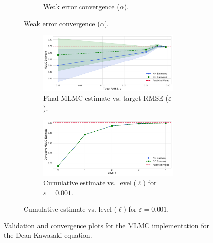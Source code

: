 \begin{figure}[htbp]
\begin{subfigure}{\textwidth}
\begin{subfigure}[b]{0.48\textwidth}
            \caption{Weak error convergence ($\alpha$).}
            \label{fig:mean_decay}
        \end{subfigure}
    \end{subfigure}
    \vspace{1cm}
    \begin{subfigure}{\textwidth}
        \centering
        \begin{subfigure}[b]{\textwidth}
            \centering
            \includegraphics[width=0.7\linewidth]{graphics/dk_conv.png}
            \caption{Final MLMC estimate vs. target RMSE ($\varepsilon$).}
            \label{fig:conv_vs_eps}
        \end{subfigure}
        \vspace{0.5cm}
        \begin{subfigure}[b]{\textwidth}
            \centering
            \includegraphics[width=0.7\linewidth]{graphics/dk_cumconv.png}
            \caption{Cumulative estimate vs. level ($\ell$) for $\varepsilon=0.001$.}
            \label{fig:cumulative_conv}
        \end{subfigure}
    \end{subfigure}
    \caption{Validation and convergence plots for the MLMC implementation for the Dean-Kawasaki equation.}
    \label{fig:she_validation_combined}
\end{figure}


